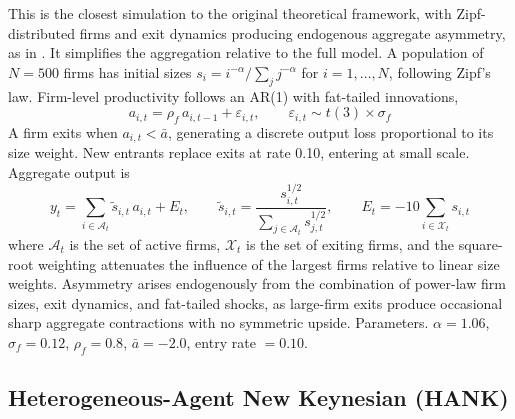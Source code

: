 \documentclass[10pt]{article}
\begin{document}
This is the closest simulation to the original theoretical framework, with Zipf-distributed firms and exit dynamics producing endogenous aggregate asymmetry, as in \citet{gabaix2011}. It simplifies the aggregation relative to the full model. A population of $N = 500$ firms has initial sizes $s_i = i^{-\alpha} / \sum_j j^{-\alpha}$ for $i = 1, \ldots, N$, following Zipf's law. Firm-level productivity follows an AR(1) with fat-tailed innovations,
\begin{equation}
a_{i,t} = \rho_f \, a_{i,t-1} + \varepsilon_{i,t}, \qquad \varepsilon_{i,t} \sim t(3) \times \sigma_f
\end{equation}
A firm exits when $a_{i,t} < \bar{a}$, generating a discrete output loss proportional to its size weight. New entrants replace exits at rate 0.10, entering at small scale. Aggregate output is
\begin{equation}
y_t = \sum_{i \in \mathcal{A}_t} \tilde{s}_{i,t} \, a_{i,t} + E_t, \qquad \tilde{s}_{i,t} = \frac{s_{i,t}^{1/2}}{\sum_{j \in \mathcal{A}_t} s_{j,t}^{1/2}}, \qquad E_t = -10 \sum_{i \in \mathcal{X}_t} s_{i,t}
\end{equation}
where $\mathcal{A}_t$ is the set of active firms, $\mathcal{X}_t$ is the set of exiting firms, and the square-root weighting attenuates the influence of the largest firms relative to linear size weights. Asymmetry arises endogenously from the combination of power-law firm sizes, exit dynamics, and fat-tailed shocks, as large-firm exits produce occasional sharp aggregate contractions with no symmetric upside. Parameters. $\alpha = 1.06$, $\sigma_f = 0.12$, $\rho_f = 0.8$, $\bar{a} = -2.0$, entry rate $= 0.10$.

\subsection*{Heterogeneous-Agent New Keynesian (HANK)}
\end{document}
